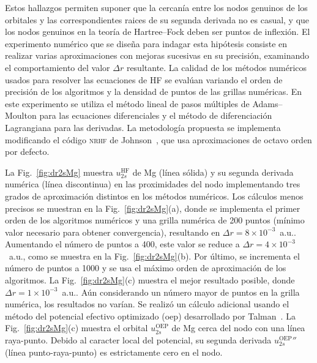 Estos hallazgos permiten suponer que la cercanía entre los nodos 
genuinos de los orbitales y las correspondientes raices de su segunda 
derivada no es casual, y que los nodos genuinos en la teoría de 
Hartree--Fock deben ser puntos de inflexión. El experimento numérico 
que se diseña para indagar esta hipótesis consiste en realizar varias 
aproximaciones con mejoras sucesivas en su precisión, examinando el 
comportamiento del valor $\Delta r$ resultante. La calidad de los 
métodos numéricos usados para resolver las ecuaciones de HF se evalúan 
variando el orden de precisión de los algoritmos y la densidad de puntos 
de las grillas numéricas. En este experimento se utiliza el método 
lineal de pasos múltiples de Adams--Moulton para las ecuaciones 
diferenciales y el método de diferenciación Lagrangiana para las 
derivadas. La metodología propuesta se implementa modificando el código 
\textsc{nrhf} de Johnson~\cite{Johnson:07}, que usa aproximaciones de 
octavo orden por defecto. %

La Fig.~\ref{fig:dr2sMg} muestra $u_{2s}^{\mathrm{HF}}$ de Mg (línea 
sólida) y su segunda derivada numérica (línea discontinua) en las 
proximidades del nodo implementando tres grados de aproximación 
distintos en los métodos numéricos. Los cálculos menos precisos se 
muestran en la Fig.~\ref{fig:dr2sMg}(a), donde se implementa el primer 
orden de los algoritmos numéricos y una grilla numérica de 200 puntos 
(mínimo valor necesario para obtener convergencia), resultando en 
$\Delta r=8\times 10^{-3}$~a.u.. Aumentando el número de puntos a 400, 
este valor se reduce a $\Delta r=4\times 10^{-3}$~a.u., como se muestra 
en la Fig.~\ref{fig:dr2sMg}(b). Por último, se incrementa el número de 
puntos a 1000 y se usa el máximo orden de aproximación de los 
algoritmos. La Fig.~\ref{fig:dr2sMg}(c) muestra el mejor resultado 
posible, donde $\Delta r=1\times 10^{-3}$~a.u.. Aún considerando un 
número mayor de puntos en la grilla numérica, los resultados no varían. 
Se realizó un cálculo adicional usando el método del potencial efectivo 
optimizado (\acs{oep}) desarrollado por Talman~\cite{Sharp:53,Talman:76,
Talman:89}. La Fig.~\ref{fig:dr2sMg}(c) muestra el orbital 
$u_{2s}^{\mathrm{OEP}}$ de Mg cerca del nodo con una línea raya-punto. 
Debido al caracter local del potencial, su segunda derivada 
$u_{2s}^{\mathrm{OEP}}''$ (línea punto-raya-punto) es estrictamente cero 
en el nodo. 


